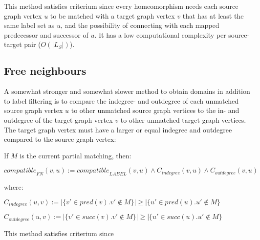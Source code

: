This method satisfies criterium \label{li:complete} since every homeomorphism needs each source graph vertex $u$ to be matched with a target graph vertex $v$ that has at least the same label set as $u$, and the possibility of connecting with each mapped predecessor and successor of $u$. It has a low computational complexity per source-target pair ($O(|L_S|)$).

\subsection{Free neighbours}
A somewhat stronger and somewhat slower method to obtain domains in addition to label filtering is to compare the indegree- and outdegree of each unmatched source graph vertex $u$ to other unmatched source graph vertices to the in- and outdegree of the target graph vertex $v$ to other unmatched target graph vertices. The target graph vertex must have a larger or equal indegree and outdegree compared to the source graph vertex:


\begin{minipage}{\textwidth}
\begin{defn} If $M$ is the current partial matching, then:

$\mathit{compatible}_{\mathit{FN}}(v,u) := \mathit{compatible}_{\mathit{LABEL}}(v,u) \land C_{\mathit{indegree}}(v, u) \land C_{\mathit{outdegree}}(v, u)$

where:

$C_{\mathit{indegree}}(u, v) := |\{v' \in \mathit{pred}(v) .  v' \not \in M\}| \geq |\{u' \in \mathit{pred}(u) . u' \not \in M\}$

$C_{\mathit{outdegree}}(u, v) := |\{v' \in \mathit{succ}(v) . v' \not \in M\}| \geq |\{u' \in \mathit{succ}(u) . u' \not \in M\}$
 
\end{defn}
\end{minipage}

This method satisfies criterium \label{li:complete} since 


